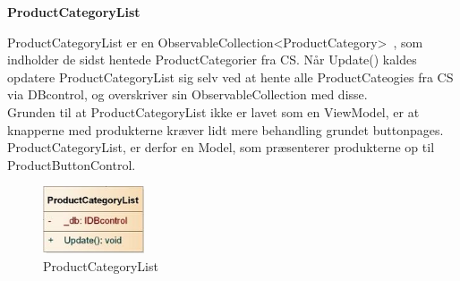 \textbf{ProductCategoryList}

ProductCategoryList er en ObservableCollection<ProductCategory>~\cite{ObsCol}, som indholder de sidst hentede ProductCategorier fra \gls{CS}. Når Update() kaldes opdatere ProductCategoryList sig selv ved at hente alle ProductCateogies fra \gls{CS} via DBcontrol, og overskriver sin ObservableCollection med disse.\\
Grunden til at ProductCategoryList ikke er lavet som en ViewModel, er at knapperne med produkterne kræver lidt mere behandling grundet buttonpages. ProductCategoryList, er derfor en Model, som præsenterer produkterne op til ProductButtonControl.

\begin{figure}[H]
    \centering
    \includegraphics[width=30mm]{Systemdesign/Frontend/BLL/Pics/ProductCategoryList}
    \caption{ProductCategoryList}
    \label{fig:ProductCategoryList}
\end{figure}

\bigskip